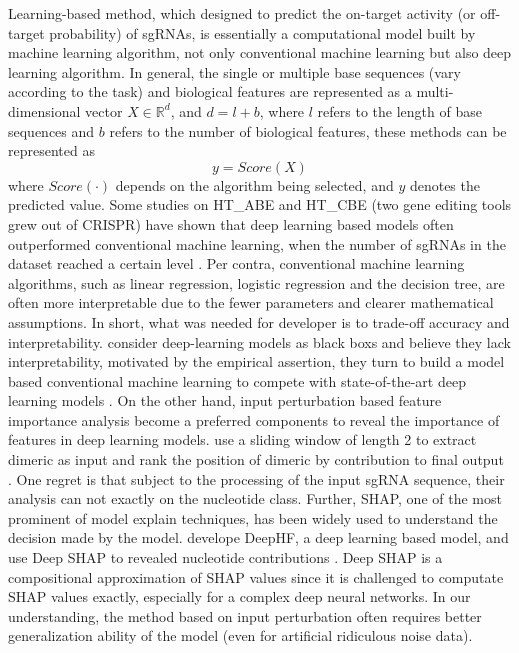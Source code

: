 \documentclass{bioinfo}
\begin{document}
Learning-based method, which designed to predict the on-target activity (or off-target probability) of sgRNAs, 
is essentially a computational model built by machine learning algorithm, not only conventional machine learning but also deep learning algorithm. 
In general, the single or multiple base sequences (vary according to the task) and biological features are represented as a multi-dimensional vector $X\in\mathbb{R}^d$, 
and $d=l+b$, where $l$ refers to the length of base sequences and $b$ refers to the number of biological features, these methods can be represented as
\begin{equation}
 y=Score( X)\label{eq:01}
\end{equation}
 where $Score(\cdot)$ depends on the algorithm being selected, and $y$ denotes the predicted value.
 Some studies on HT\_ABE and HT\_CBE (two gene editing tools grew out of CRISPR) have shown that deep learning based models often outperformed conventional machine learning, when the number of sgRNAs in the dataset reached a certain level \citep{Song2020,kim2018deep,kim2019spcas9}. 
 Per contra, conventional machine learning algorithms, such as linear regression, logistic regression and the decision tree, are often more interpretable due to the fewer parameters and clearer mathematical assumptions. 
 In short, what was needed for developer is to trade-off accuracy and interpretability. 
 \citeauthor{MuhammadRafid2020} consider deep-learning models as black boxs and believe they lack interpretability, 
 motivated by the empirical assertion, they turn to build a model based conventional machine learning to compete with state-of-the-art deep learning models \citep{MuhammadRafid2020}. 
 On the other hand, input perturbation based feature importance analysis become a preferred components to reveal the importance of features in deep learning models. 
 \citeauthor{Liu2019} use a sliding window of length 2 to extract dimeric as input and rank the position of dimeric by contribution to final output \citep{Liu2019}. 
 One regret is that subject to the processing of the input sgRNA sequence, their analysis can not exactly on the nucleotide class. 
 Further, SHAP, one of the most prominent of model explain techniques, has been widely used to understand the decision made by the model. 
 \citeauthor{wang2019optimized} develope DeepHF, a deep learning based model, and use Deep SHAP to revealed nucleotide contributions \citep{wang2019optimized}. 
 Deep SHAP is a compositional approximation of SHAP values since it is challenged to computate SHAP values exactly, especially for a complex deep neural networks. 
 In our understanding, the method based on input perturbation often requires better generalization ability of the model (even for artificial ridiculous noise data). 
\end{document}

